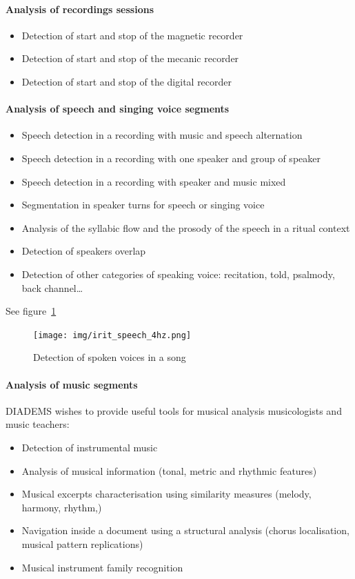 \documentclass{sig-alternate}
\begin{document}
\paragraph{Analysis of recordings sessions}
\begin{itemize}
\item Detection of start and stop of the magnetic recorder
\item Detection of start and stop of the mecanic recorder
\item Detection of start and stop of the digital recorder
\end{itemize}
\paragraph{Analysis of speech and singing voice segments}
\begin{itemize}
\item Speech detection in a recording with music and speech
  alternation
\item Speech detection in a recording with one speaker and group of
  speaker
\item Speech detection in a recording with speaker and music mixed
\item Segmentation in speaker turns for speech or singing voice
\item Analysis of the syllabic flow and the prosody of the speech in a
  ritual context
\item Detection of speakers overlap
\item Detection of other categories of speaking voice: recitation,
  told, psalmody, back channel…
\end{itemize}
See figure~\ref{fig:speech_detection}
\begin{figure}
  \centering
 \texttt{[image: img/irit\_speech\_4hz.png]} 
  \caption{Detection of spoken voices in a song}
  \label{fig:speech_detection}
\end{figure}

\paragraph{Analysis of music segments}

DIADEMS wishes to provide useful tools for musical analysis musicologists and music teachers:
\begin{itemize}
\item Detection of instrumental music
\item Analysis of musical information (tonal, metric and rhythmic
  features)
\item Musical excerpts characterisation using similarity measures
  (melody, harmony, rhythm,)
\item Navigation inside a document using a structural analysis (chorus
  localisation, musical pattern replications)
\item Musical instrument family recognition
\end{itemize}
\end{document}
